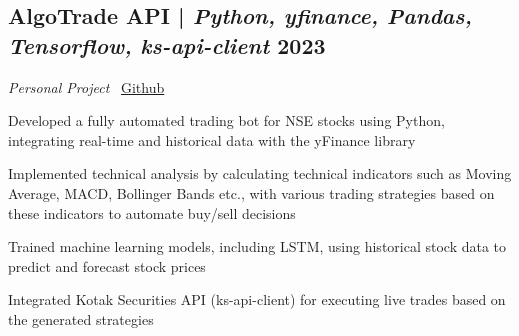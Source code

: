 \subsection{AlgoTrade API \textnormal{ | \textit{Python, yfinance, Pandas, Tensorflow, ks-api-client} \hfill 2023}}
\textit{Personal Project} \hfill \faCodeFork\ \href{https://github.com/vinay-ram1999/AlgoTrade-API}{Github}
\begin{zitemize}
    \item Developed a fully automated trading bot for NSE stocks using Python, integrating real-time and historical data with the yFinance library
    \item Implemented technical analysis by calculating technical indicators such as Moving Average, MACD, Bollinger Bands etc., with various trading strategies based on these indicators to automate buy/sell decisions
    \item Trained machine learning models, including LSTM, using historical stock data to predict and forecast stock prices
    \item Integrated Kotak Securities API (ks-api-client) for executing live trades based on the generated strategies
\end{zitemize}




